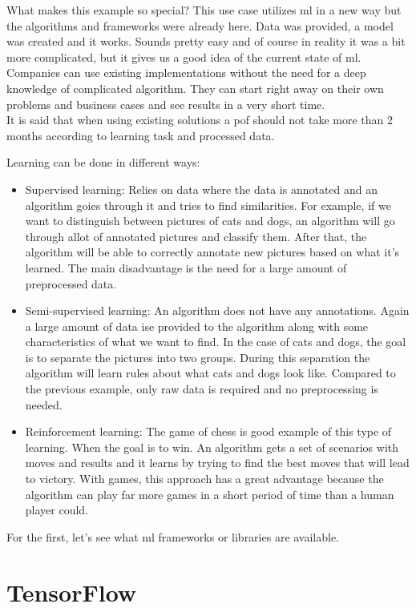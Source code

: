 \documentclass[thesis=M,english]{FITthesis}[2012/06/26]
\begin{document}
What makes this example so special? This use case utilizes  \acrshort{ml} in a new way but the algorithms and frameworks were already here. Data was provided, a model was created and it works. Sounds pretty easy and of course in reality it was a bit more complicated, but it gives us a good idea of the current state of \acrshort{ml}. Companies can use existing implementations without the need for a deep knowledge of complicated algorithm. They can start right away on their own problems and business cases and see results in a very short time.\\

It is said that when using existing solutions a \acrshort{pof} should not take more than 2 months according to learning task and processed data.

Learning can be done in different ways: 
\begin{itemize}[nosep]
\item Supervised learning: Relies on data where the data is annotated and an algorithm goies through it and tries to find similarities. For example, if we want to distinguish between pictures of cats and dogs,  an algorithm will go through allot of annotated pictures and classify them. After that, the algorithm will be able to correctly annotate new pictures based on what it's learned. The main disadvantage is the need for a large amount of preprocessed data. 
\item Semi-supervised learning: An algorithm does not have any annotations. Again a large amount of data ise provided to the algorithm along with some characteristics of what we want to find. In the case of cats and dogs, the goal is to separate the pictures into two groups. During this separation the algorithm will learn rules about what cats and dogs look like. Compared to the previous example, only raw data is required and no preprocessing is needed.
\item Reinforcement learning: The game of chess is good example of this type of learning. When the goal is to win. An algorithm gets a set of scenarios with moves and results and it learns by trying to find the best moves that will lead to victory. With games, this approach has a great advantage because the algorithm can play far more games in a short period of time than a human player could.
\end{itemize}


For the first, let's see what \acrshort{ml} frameworks or libraries are available.

\section{TensorFlow}
\end{document}
